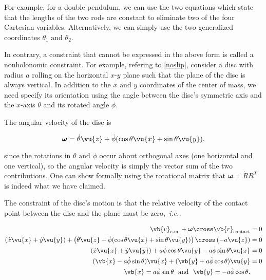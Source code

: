 \documentclass[a4paper,12pt]{report}
\begin{document}
For example, for a double pendulum, we can use the two equations which state that the lengths of the two rods are constant to eliminate two of the four Cartesian variables. Alternatively, we can simply use the two generalized coordinates \(\theta _{1} \text { and } \theta _{2}  \).  

In contrary, a constraint that cannot be expressed in the above form is called a nonholonomic constraint. For example, refering to \cref{noslip}, consider a disc with radius \(a\) rolling on the horizontal \(x\)-\(y\) plane such that the plane of the disc is always vertical. In addition to the \(x \text{ and }  y\) coordinates of the center of mass, we need specify its orientation using the angle between the disc's symmetric axis and the \(x\)-axis \(\theta \) and its rotated angle \(\phi \). 


The angular velocity of the disc is 

\begin{equation}
	\boldsymbol{\omega } = \dot{\theta }\vu{z} + \dot{\phi }(\cos \theta \vu{x} + \sin \theta \vu{y} ),   
\end{equation}

since the rotations in \(\theta \text { and } \phi \) occur about orthogonal axes (one horizontal and one vertical), so the angular velocity is simply the vector sum of the two contributions. One can show formally using the rotational matrix that \(\boldsymbol{\omega } = \dot{R}R^T  \) is indeed what we have claimed.  

The constraint of the disc's motion is that the relative velocity of the contact point between the disc and the plane must be zero, \textit{i.e.,} 

\begin{equation}
\begin{aligned}
	\vb{v} _{\text{c.m.} } + \boldsymbol{\omega }\cross \vb{r} _{\text{contact} } &= 0\\  
	\left(\dot{x} \vu{x} + \dot{y} \vu{y} \right) + \left( \dot{\theta }\vu{z} + \dot{\phi } (\cos \theta \vu{x} + \sin \theta \vu{y} )\right) \cross \left(-a\vu{z} \right) &= 0 \\
	(\dot{x} \vu{x} + \dot{y} \vu{y} ) + a\dot{\phi } \cos \theta \vu{y} - a\dot{\phi } \sin \theta \vu{x} &= 0 \\
	(\vb{x} - a\dot{\phi } \sin \theta) \vu{x} + (\vb{y} + a\dot{\phi } \cos \theta)\vu{y} &= 0 \\
	\vb{x} = a\dot{\phi } \sin \theta ~\text{ and }~ \vb{y} = -a\dot{\phi } \cos \theta.
\end{aligned}
\end{equation}
\end{document}
